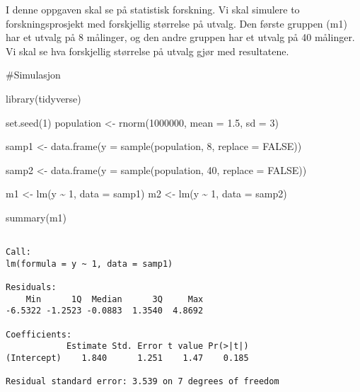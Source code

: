 \documentclass[
  letterpaper,
  DIV=11,
  numbers=noendperiod]{scrreprt}
\newenvironment{Shaded}{\begin{snugshade}}{\end{snugshade}}
\newcommand{\AttributeTok}[1]{\textcolor[rgb]{0.40,0.45,0.13}{#1}}
\newcommand{\ConstantTok}[1]{\textcolor[rgb]{0.56,0.35,0.01}{#1}}
\newcommand{\DecValTok}[1]{\textcolor[rgb]{0.68,0.00,0.00}{#1}}
\newcommand{\FloatTok}[1]{\textcolor[rgb]{0.68,0.00,0.00}{#1}}
\newcommand{\FunctionTok}[1]{\textcolor[rgb]{0.28,0.35,0.67}{#1}}
\newcommand{\NormalTok}[1]{\textcolor[rgb]{0.00,0.23,0.31}{#1}}
\newcommand{\OtherTok}[1]{\textcolor[rgb]{0.00,0.23,0.31}{#1}}
\newcommand{\SpecialCharTok}[1]{\textcolor[rgb]{0.37,0.37,0.37}{#1}}
\begin{document}
I denne oppgaven skal se på statistisk forskning. Vi skal simulere to
forskningsprosjekt med forskjellig størrelse på utvalg. Den første
gruppen (m1) har et utvalg på 8 målinger, og den andre gruppen har et
utvalg på 40 målinger. Vi skal se hva forskjellig størrelse på utvalg
gjør med resultatene.

\#Simulasjon

\begin{Shaded}
\begin{Highlighting}[]
\FunctionTok{library}\NormalTok{(tidyverse)}

\FunctionTok{set.seed}\NormalTok{(}\DecValTok{1}\NormalTok{)}
\NormalTok{population }\OtherTok{\textless{}{-}} \FunctionTok{rnorm}\NormalTok{(}\DecValTok{1000000}\NormalTok{, }\AttributeTok{mean =} \FloatTok{1.5}\NormalTok{, }\AttributeTok{sd =} \DecValTok{3}\NormalTok{)}


\NormalTok{samp1 }\OtherTok{\textless{}{-}} \FunctionTok{data.frame}\NormalTok{(}\AttributeTok{y =} \FunctionTok{sample}\NormalTok{(population, }\DecValTok{8}\NormalTok{, }\AttributeTok{replace =} \ConstantTok{FALSE}\NormalTok{))}

\NormalTok{samp2 }\OtherTok{\textless{}{-}} \FunctionTok{data.frame}\NormalTok{(}\AttributeTok{y =} \FunctionTok{sample}\NormalTok{(population, }\DecValTok{40}\NormalTok{, }\AttributeTok{replace =} \ConstantTok{FALSE}\NormalTok{))}


\NormalTok{m1 }\OtherTok{\textless{}{-}} \FunctionTok{lm}\NormalTok{(y }\SpecialCharTok{\textasciitilde{}} \DecValTok{1}\NormalTok{, }\AttributeTok{data =}\NormalTok{ samp1)}
\NormalTok{m2 }\OtherTok{\textless{}{-}} \FunctionTok{lm}\NormalTok{(y }\SpecialCharTok{\textasciitilde{}} \DecValTok{1}\NormalTok{, }\AttributeTok{data =}\NormalTok{ samp2)}

\FunctionTok{summary}\NormalTok{(m1)}
\end{Highlighting}
\end{Shaded}

\begin{verbatim}

Call:
lm(formula = y ~ 1, data = samp1)

Residuals:
    Min      1Q  Median      3Q     Max 
-6.5322 -1.2523 -0.0883  1.3540  4.8692 

Coefficients:
            Estimate Std. Error t value Pr(>|t|)
(Intercept)    1.840      1.251    1.47    0.185

Residual standard error: 3.539 on 7 degrees of freedom
\end{verbatim}
\end{document}
